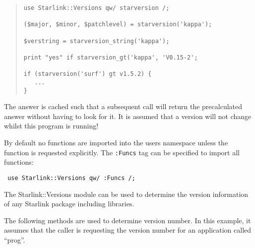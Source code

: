\documentclass[twoside,11pt]{article}
\newenvironment{myquote}{\begin{quote}\begin{small}}{\end{small}\end{quote}}
\renewcommand{\_}{\texttt{\symbol{95}}}
\begin{document}
\begin{myquote}
\begin{verbatim}
use Starlink::Versions qw/ starversion /;

($major, $minor, $patchlevel) = starversion('kappa');

$verstring = starversion_string('kappa');

print "yes" if starversion_gt('kappa', 'V0.15-2';

if (starversion('surf') gt v1.5.2) {
   ...
}
\end{verbatim}
\end{myquote}



The answer is cached such that a subsequent call will return the
precalculated answer without having to look for it. It is assumed that
a version will not change whilst this program is running!



By default no functions are imported into the users namespace unless
the function is requested explicitly. The \texttt{:Funcs} tag can be
specified to import all functions:

\begin{verbatim}
 use Starlink::Versions qw/ :Funcs /;
\end{verbatim}

The Starlink::Versions module can be used to determine the version
information of any Starlink package including libraries.

The following methods are used to determine version number.
In this example, it assumes that the caller is requesting the
version number for an application called ``prog''.
\end{document}
